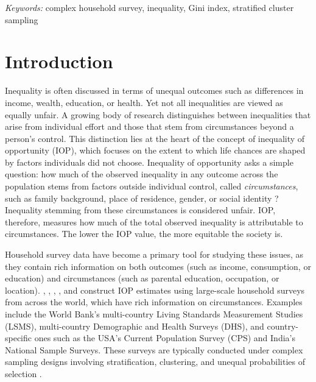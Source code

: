 \documentclass[12pt]{article}
\theoremstyle{plain}
\theoremstyle{definition}
\begin{document}
\noindent%
{\it Keywords:} complex household survey, inequality, Gini index,
stratified cluster sampling
\vfill

\newpage
{} %

\section{Introduction}
\label{sec:intro}

Inequality is often discussed in terms of unequal outcomes such as differences in income, wealth, education, or health. Yet not all inequalities are viewed as equally unfair. A growing body of research distinguishes between inequalities that arise from individual effort and those that stem from circumstances beyond a person's control.
This distinction lies at the heart of the concept of inequality of opportunity (IOP), which focuses on the extent to which life chances are shaped by factors individuals did not choose. Inequality of opportunity asks a simple question: how much of the observed inequality in any outcome across the population stems from factors outside individual control, called \textit{circumstances}, such as family background, place of residence, gender, or social identity \citep[e.g.,][]{roemer2015equality, ferreira2011measurement}? Inequality stemming from these circumstances is considered unfair. IOP, therefore, measures how much of the total observed inequality is attributable to circumstances. The lower the IOP value, the more equitable the society is.

Household survey data have become a primary tool for studying these issues, as they contain rich information on both outcomes (such as income, consumption, or education) and circumstances (such as parental education, occupation, or location). \cite{ferreira2011measurement}, \cite{ASADULLAH20121151}, \cite{Brunori}, \cite{Ashish2011}, and \cite{lefranc2020inequality} construct IOP estimates using large-scale household surveys from across the world, which have rich information on circumstances. Examples include the World Bank's multi-country Living Standards Measurement Studies (LSMS), multi-country Demographic and Health Surveys (DHS), and country-specific ones such as the USA's Current Population Survey (CPS) and India's National Sample Surveys. These surveys are typically conducted under complex sampling designs involving stratification, clustering, and unequal probabilities of selection \citep[e.g.,][]{lohr2021sampling}.
\end{document}
